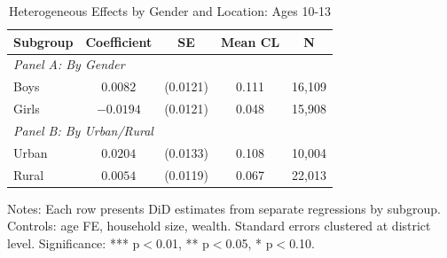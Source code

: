 \begin{table}[H]
\centering
\caption{Heterogeneous Effects by Gender and Location: Ages 10-13}
\label{tab:demo_hetero}
\begin{threeparttable}
\begin{tabular}{lcccc}
\toprule
Subgroup & Coefficient & SE & Mean CL & N \\
\midrule
\multicolumn{5}{l}{\textit{Panel A: By Gender}} \\
\quad Boys & $0.0082$ & (0.0121) & 0.111 & 16,109 \\
\quad Girls & $-0.0194$ & (0.0121) & 0.048 & 15,908 \\
\midrule
\multicolumn{5}{l}{\textit{Panel B: By Urban/Rural}} \\
\quad Urban & $0.0204$ & (0.0133) & 0.108 & 10,004 \\
\quad Rural & $0.0054$ & (0.0119) & 0.067 & 22,013 \\
\bottomrule
\end{tabular}
\begin{tablenotes}
\footnotesize
\item Notes: Each row presents DiD estimates from separate regressions by subgroup. Controls: age FE, household size, wealth. Standard errors clustered at district level. Significance: *** p$<$0.01, ** p$<$0.05, * p$<$0.10.
\end{tablenotes}
\end{threeparttable}
\end{table}